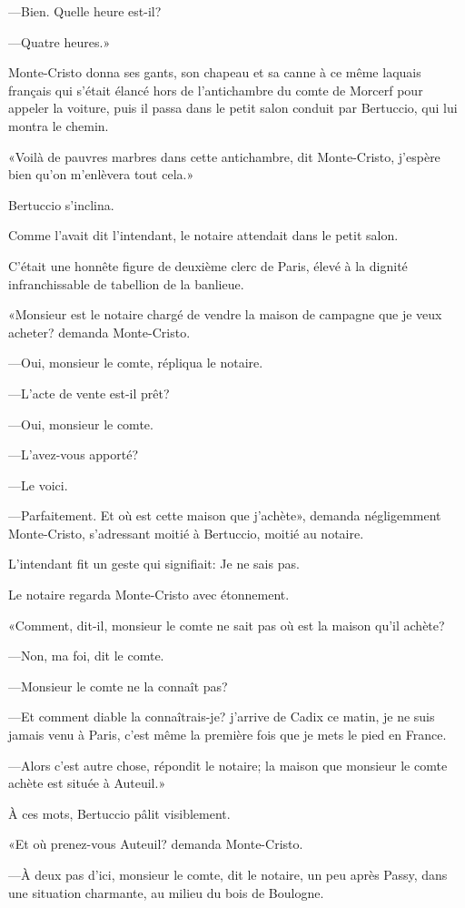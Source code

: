 —Bien. Quelle heure est-il? 

—Quatre heures.» 

Monte-Cristo donna ses gants, son chapeau et sa canne à ce même laquais français qui s'était élancé hors de l'antichambre du comte de Morcerf pour appeler la voiture, puis il passa dans le petit salon conduit par Bertuccio, qui lui montra le chemin. 

«Voilà de pauvres marbres dans cette antichambre, dit Monte-Cristo, j'espère bien qu'on m'enlèvera tout cela.» 

Bertuccio s'inclina. 

Comme l'avait dit l'intendant, le notaire attendait dans le petit salon. 

C'était une honnête figure de deuxième clerc de Paris, élevé à la dignité infranchissable de tabellion de la banlieue.  

«Monsieur est le notaire chargé de vendre la maison de campagne que je veux acheter? demanda Monte-Cristo. 

—Oui, monsieur le comte, répliqua le notaire. 

—L'acte de vente est-il prêt? 

—Oui, monsieur le comte. 

—L'avez-vous apporté? 

—Le voici. 

—Parfaitement. Et où est cette maison que j'achète», demanda négligemment Monte-Cristo, s'adressant moitié à Bertuccio, moitié au notaire. 

L'intendant fit un geste qui signifiait: Je ne sais pas. 

Le notaire regarda Monte-Cristo avec étonnement. 

«Comment, dit-il, monsieur le comte ne sait pas où est la maison qu'il achète? 

—Non, ma foi, dit le comte. 

—Monsieur le comte ne la connaît pas? 

—Et comment diable la connaîtrais-je? j'arrive de Cadix ce matin, je ne suis jamais venu à Paris, c'est même la première fois que je mets le pied en France. 

—Alors c'est autre chose, répondit le notaire; la maison que monsieur le comte achète est située à Auteuil.» 

À ces mots, Bertuccio pâlit visiblement. 

«Et où prenez-vous Auteuil? demanda Monte-Cristo. 

—À deux pas d'ici, monsieur le comte, dit le notaire, un peu après Passy, dans une situation charmante, au milieu du bois de Boulogne.  

